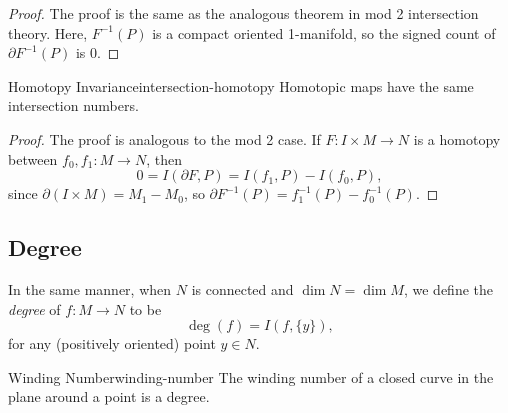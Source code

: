 \begin{proof}
    The proof is the same as the analogous theorem in mod 2 intersection theory. Here, $F^{-1}(P)$ is a compact oriented 1-manifold, so the signed count of $\partial F^{-1}(P)$ is $0$.
\end{proof}

\begin{center}
\end{center}

\begin{proposition}{Homotopy Invariance}{intersection-homotopy}
    Homotopic maps have the same intersection numbers.
\end{proposition}

\begin{proof}
    The proof is analogous to the mod 2 case. If $F \colon I \times M \to N$ is a homotopy between $f_0, f_1 \colon M \to N$, then
    \[
        0 = I(\partial F, P) = I(f_1, P) - I(f_0, P),
    \]
    since $\partial(I \times M) = M_1 - M_0$, so $\partial F^{-1}(P) = f_1^{-1}(P) - f_0^{-1}(P)$.
\end{proof}

\subsection{Degree}

In the same manner, when $N$ is connected and $\dim N = \dim M$, we define the \emph{degree} of $f \colon M \to N$ to be
\[
    \deg(f) = I(f, \{y\}),
\]
for any (positively oriented) point $y \in N$.

\begin{example}{Winding Number}{winding-number}
    The winding number of a closed curve in the plane around a point is a degree.
\end{example}

